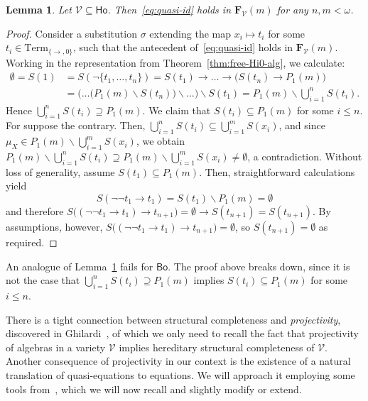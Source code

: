 \documentclass{amsart}
\newtheorem{lemma}[theorem]{Lemma}
\newcommand{\alg}[1]{\mathbf{#1}}
\newcommand{\FV}{\alg{F}_\mathcal{V}}
\def\ra{\rightarrow}
\begin{document}
\begin{lemma}\label{lem:1-holds-on-free}
Let $\mathcal{V}\subseteq \mathsf{Ho}$. Then~\eqref{eq:quasi-id} holds in
$\FV(m)$ for any $n, m<\omega$. 
\end{lemma}  

\begin{proof}
Consider a substitution $\sigma$ extending the map
$x_i\mapsto t_i$ for some $t_i\in\mathrm{Term}_{\{\ra,0\}}$, 
such that the antecedent of~\eqref{eq:quasi-id}  
holds in $\FV(m)$. Working in the representation from
Theorem~\ref{thm:free-Hi0-alg}, we calculate: 
\begin{align*}
\emptyset = S(1)
&= S(\neg\{t_1,\dots, t_n\})
   = S(t_1)\ra \dots\ra\bigl(S(t_n)\ra P_1(m)\bigr)\\
&= \bigl(\dots\bigl(P_1(m)\smallsetminus
  S(t_n)\bigr)\smallsetminus\dots\bigr)\smallsetminus S(t_1)
= P_1(m)\smallsetminus \bigcup_{i=1}^nS(t_i).  
\end{align*}
Hence $\bigcup_{i=1}^nS(t_i)\supseteq P_1(m)$. We claim that
$S(t_i)\subseteq P_1(m)$ for some $i\leq n$. For suppose the contrary.
Then, $\bigcup_{i=1}^nS(t_i)\subseteq \bigcup_{i=1}^{m}S(x_i)$,
and since $\mu_X\in P_1(m)\smallsetminus \bigcup_{i=1}^mS(x_i)$,
we obtain $P_1(m)\smallsetminus \bigcup_{i=1}^nS(t_i)\supseteq
P_1(m)\smallsetminus \bigcup_{i=1}^mS(x_i) \neq \emptyset$, a contradiction. 
Without loss of
generality, assume $S(t_1)\subseteq P_1(m)$. Then, straightforward calculations yield
$$
S(\neg\neg t_1\ra t_1) = S(t_1)\smallsetminus P_1(m) = \emptyset  
$$
and therefore 
$S\bigl((\neg\neg t_1\ra t_1)\ra t_{n+1}\bigr) =
\emptyset \ra S(t_{n+1}) = S(t_{n+1})$. 
By assumptions, however,
$S\bigl((\neg\neg t_1\ra t_1)\ra t_{n+1}\bigr) = \emptyset$,
so $S(t_{n+1}) = \emptyset$ as required.
\end{proof}

An analogue of Lemma~\ref{lem:1-holds-on-free} fails for
$\mathsf{Bo}$. The proof above breaks down, 
since it is not the case that $\bigcup_{i=1}^nS(t_i)\supseteq P_1(m)$
implies
$S(t_i)\subseteq P_1(m)$ for some $i\leq n$.

There is a
tight connection between structural completeness and \emph{projectivity},
discovered in Ghilardi~\cite{Ghi99}, of which we only need to recall the fact
that projectivity of algebras in a variety $\mathcal{V}$ implies hereditary
structural completeness of $\mathcal{V}$. Another consequence
of projectivity in our context is the existence of a natural translation of
quasi-equations to equations. We will approach it employing some tools 
from~\cite{Slo12}, which we will now recall and slightly modify or
extend.
\end{document}
